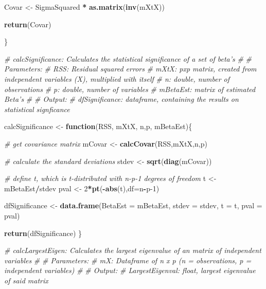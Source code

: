 \documentclass[
]{article}
\newenvironment{Shaded}{\begin{snugshade}}{\end{snugshade}}
\newcommand{\CommentTok}[1]{\textcolor[rgb]{0.56,0.35,0.01}{\textit{#1}}}
\newcommand{\ControlFlowTok}[1]{\textcolor[rgb]{0.13,0.29,0.53}{\textbf{#1}}}
\newcommand{\DataTypeTok}[1]{\textcolor[rgb]{0.13,0.29,0.53}{#1}}
\newcommand{\DecValTok}[1]{\textcolor[rgb]{0.00,0.00,0.81}{#1}}
\newcommand{\KeywordTok}[1]{\textcolor[rgb]{0.13,0.29,0.53}{\textbf{#1}}}
\newcommand{\NormalTok}[1]{#1}
\newcommand{\OperatorTok}[1]{\textcolor[rgb]{0.81,0.36,0.00}{\textbf{#1}}}
\newcommand{\StringTok}[1]{\textcolor[rgb]{0.31,0.60,0.02}{#1}}
\begin{document}
\begin{Shaded}
\begin{Highlighting}[]
{{\NormalTok{  Covar <-}\StringTok{ }\NormalTok{SigmaSquared }\OperatorTok{*}\StringTok{ }\KeywordTok{as.matrix}\NormalTok{(}\KeywordTok{inv}\NormalTok{(mXtX))}
  
  \KeywordTok{return}\NormalTok{(Covar)}
  
\NormalTok{\}}

\CommentTok{# calcSignificance: Calculates the statistical significance of a set of beta's}
\CommentTok{#}
\CommentTok{# Parameters: }
\CommentTok{#   RSS: Residual squared errors}
\CommentTok{#   mXtX: pxp matrix, created from independent variables (X), multiplied with itself}
\CommentTok{#   n: double, number of observations}
\CommentTok{#   p: double, number of variables}
\CommentTok{#   mBetaEst: matrix of estimated Beta's}
\CommentTok{#}
\CommentTok{# Output:}
\CommentTok{#   dfSignificance: dataframe, containing the results on statistical signficance}

\NormalTok{calcSignificance <-}\StringTok{ }\ControlFlowTok{function}\NormalTok{(RSS, mXtX, n,p, mBetaEst)\{}
  
  \CommentTok{# get covariance matrix}
\NormalTok{  mCovar <-}\StringTok{ }\KeywordTok{calcCovar}\NormalTok{(RSS,mXtX,n,p)}
  
  \CommentTok{# calculate the standard deviations}
\NormalTok{  stdev <-}\StringTok{ }\KeywordTok{sqrt}\NormalTok{(}\KeywordTok{diag}\NormalTok{(mCovar))}
  
  \CommentTok{# define t, which is t-distributed with n-p-1 degrees of freedom }
\NormalTok{  t <-}\StringTok{ }\NormalTok{mBetaEst}\OperatorTok{/}\NormalTok{stdev}
\NormalTok{  pval <-}\StringTok{ }\DecValTok{2}\OperatorTok{*}\KeywordTok{pt}\NormalTok{(}\OperatorTok{-}\KeywordTok{abs}\NormalTok{(t),}\DataTypeTok{df=}\NormalTok{n}\OperatorTok{-}\NormalTok{p}\DecValTok{-1}\NormalTok{)}
  
\NormalTok{  dfSignificance <-}\StringTok{ }\KeywordTok{data.frame}\NormalTok{(}\DataTypeTok{BetaEst =}\NormalTok{ mBetaEst, }
                               \DataTypeTok{stdev =}\NormalTok{ stdev, }
                               \DataTypeTok{t =}\NormalTok{ t, }
                               \DataTypeTok{pval =}\NormalTok{ pval)}
  
  \KeywordTok{return}\NormalTok{(dfSignificance)}
\NormalTok{\}}

\CommentTok{# calcLargestEigen: Calculates the largest eigenvalue of an matrix of independent variables}
\CommentTok{# }
\CommentTok{# Parameters: }
\CommentTok{#   mX: Dataframe of n x p (n = observations, p = independent variables)}
\CommentTok{#   }
\CommentTok{# Output:}
\CommentTok{#   LargestEigenval: float, largest eigenvalue of said matrix}

}}
\end{Highlighting}
\end{Shaded}
\end{document}

